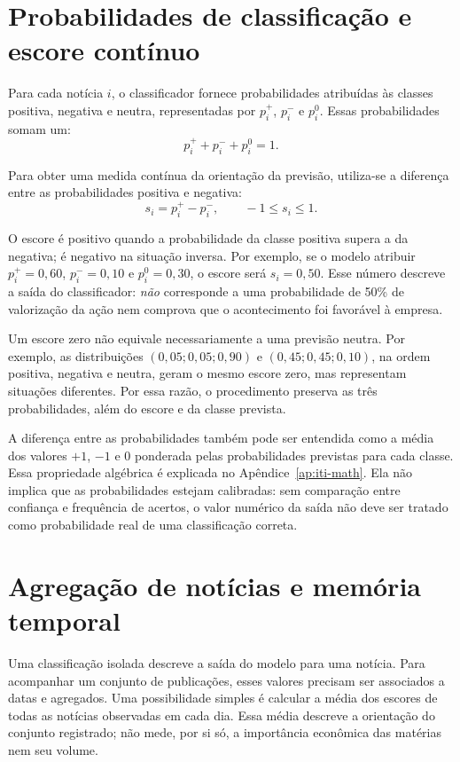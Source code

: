 \section{Probabilidades de classificação e escore contínuo}

Para cada notícia $i$, o classificador fornece probabilidades atribuídas às classes positiva, negativa e neutra, representadas por $p_i^+$, $p_i^-$ e $p_i^0$. Essas probabilidades somam um:
\begin{equation}
    p_i^+ + p_i^- + p_i^0 = 1.
\end{equation}

Para obter uma medida contínua da orientação da previsão, utiliza-se a diferença entre as probabilidades positiva e negativa:
\begin{equation}
    s_i = p_i^+ - p_i^- , \qquad -1 \leq s_i \leq 1.
\end{equation}

O escore é positivo quando a probabilidade da classe positiva supera a da negativa; é negativo na situação inversa. Por exemplo, se o modelo atribuir $p_i^+=0{,}60$, $p_i^-=0{,}10$ e $p_i^0=0{,}30$, o escore será $s_i=0{,}50$. Esse número descreve a saída do classificador: \emph{não} corresponde a uma probabilidade de 50\% de valorização da ação nem comprova que o acontecimento foi favorável à empresa.

Um escore zero não equivale necessariamente a uma previsão neutra. Por exemplo, as distribuições $(0{,}05;0{,}05;0{,}90)$ e $(0{,}45;0{,}45;0{,}10)$, na ordem positiva, negativa e neutra, geram o mesmo escore zero, mas representam situações diferentes. Por essa razão, o procedimento preserva as três probabilidades, além do escore e da classe prevista.

A diferença entre as probabilidades também pode ser entendida como a média dos valores $+1$, $-1$ e $0$ ponderada pelas probabilidades previstas para cada classe. Essa propriedade algébrica é explicada no Apêndice~\ref{ap:iti-math}. Ela não implica que as probabilidades estejam calibradas: sem comparação entre confiança e frequência de acertos, o valor numérico da saída não deve ser tratado como probabilidade real de uma classificação correta.

\section{Agregação de notícias e memória temporal}

Uma classificação isolada descreve a saída do modelo para uma notícia. Para acompanhar um conjunto de publicações, esses valores precisam ser associados a datas e agregados. Uma possibilidade simples é calcular a média dos escores de todas as notícias observadas em cada dia. Essa média descreve a orientação do conjunto registrado; não mede, por si só, a importância econômica das matérias nem seu volume.

